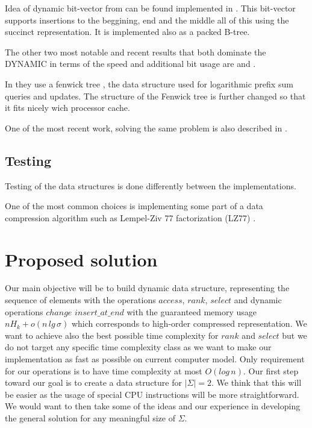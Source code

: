 Idea of dynamic bit-vector from \cite{policriti2015average} can be found implemented in \cite{ds-bitvector}. This bit-vector supports insertions to the beggining, end and the middle all of this using the succinct representation. It is implemented also as a packed B-tree.

The other two most notable and recent results that both dominate the DYNAMIC in terms of the speed and additional bit usage are \cite{marchini2020compact} and \cite{pibiri2020rank}.

In \cite{marchini2020compact} they use a fenwick tree \cite{fenwick1994new}, the data structure used for logarithmic prefix sum queries and updates. The structure of the Fenwick tree is further changed so that it fits nicely wich processor cache.

One of the most recent work, solving the same problem is also described in \cite{pibiri2020rank}.

\subsection{Testing}

Testing of the data structures is done differently between the implementations.

One of the most common choices is implementing some part of a data compression algorithm such as Lempel-Ziv 77 factorization (LZ77) \cite{ziv1977universal}.


\section{Proposed solution}

Our main objective will be to build dynamic data structure, representing the sequence of elements with the operations $access$, $rank$, $select$ and dynamic operations $change$ $insert\_at\_end$ with the guaranteed memory usage $nH_k+o(n\,lg\,\sigma)$ which corresponds to high-order compressed representation. We want to achieve also the best possible time complexity for $rank$ and $select$ but we do not target any specific time complexity class as we want to make our implementation as fast as possible on current computer model. Only requirement for our operations is to have time complexity at most $O(log\,n)$. Our first step toward our goal is to create a data structure for $|\Sigma|=2$. We think that this will be easier as the usage of special CPU instructions will be more straightforward. We would want to then take some of the ideas and our experience in developing the general solution for any meaningful size of $\Sigma$.
